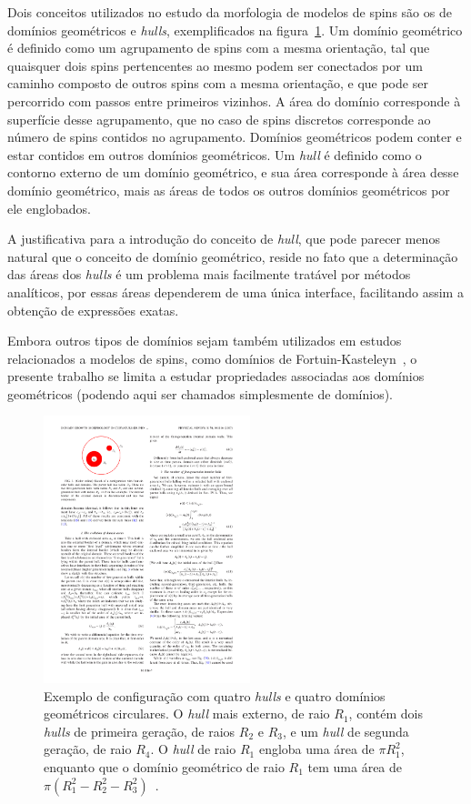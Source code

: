 Dois conceitos utilizados no estudo da morfologia de modelos de spins são os de domínios geométricos e \textit{hulls}, exemplificados na figura~\ref{fig.DomainsHulls}. Um domínio geométrico é definido como um agrupamento de spins com a mesma orientação, tal que quaisquer dois spins pertencentes ao mesmo podem ser conectados por um caminho composto de outros spins com a mesma orientação, e que pode ser percorrido com passos entre primeiros vizinhos. A área do domínio corresponde à superfície desse agrupamento, que no caso de spins discretos corresponde ao número de spins contidos no agrupamento. Domínios geométricos podem conter e estar contidos em outros domínios geométricos. Um \textit{hull} é definido como o contorno externo de um domínio geométrico, e sua área corresponde à área desse domínio geométrico, mais as áreas de todos os outros domínios geométricos por ele englobados.

A justificativa para a introdução do conceito de \textit{hull}, que pode parecer menos natural que o conceito de domínio geométrico, reside no fato que a determinação das áreas dos \textit{hulls} é um problema mais facilmente tratável por métodos analíticos, por essas áreas dependerem de uma única interface, facilitando assim a obtenção de expressões exatas.

Embora outros tipos de domínios sejam também utilizados em estudos relacionados a modelos de spins, como domínios de Fortuin-Kasteleyn~\cite{FortuinKasteleyn}, o presente trabalho se limita a estudar propriedades associadas aos domínios geométricos (podendo aqui ser chamados simplesmente de domínios).

\begin{figure}
 \centering
 \includegraphics[width=6cm]{img/DomainsHulls.pdf}
 \caption{Exemplo de configuração com quatro \textit{hulls} e quatro domínios geométricos circulares. O \textit{hull} mais externo, de raio $R_1$, contém dois \textit{hulls} de primeira geração, de raios $R_2$ e $R_3$, e um \textit{hull} de segunda geração, de raio $R_4$. O \textit{hull} de raio $R_1$ engloba uma área de $\pi R_1^2$, enquanto que o domínio geométrico de raio $R_1$ tem uma área de $\pi(R_1^2-R_2^2-R_3^2)$~\cite{PREJeferson}.}
\label{fig.DomainsHulls}
\end{figure}


